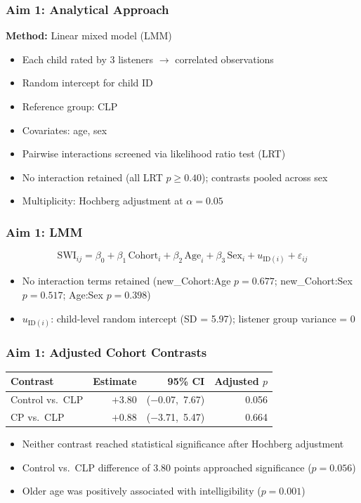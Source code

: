 \documentclass{beamer}
\begin{document}
\begin{frame}
\frametitle{Aim 1: Analytical Approach}
\textbf{Method:} Linear mixed model (LMM)
\begin{itemize}
  \item Each child rated by 3 listeners $\to$ correlated observations
  \item Random intercept for child ID 
  \item Reference group: CLP
  \item Covariates: age, sex
  \item Pairwise interactions screened via likelihood ratio test (LRT)
  \item No interaction retained (all LRT $p \geq 0.40$); contrasts pooled across sex
  \item Multiplicity: Hochberg adjustment at $\alpha = 0.05$
\end{itemize}
\end{frame}
\begin{frame}
\frametitle{Aim 1: LMM}
\[
\text{SWI}_{ij} = \beta_0 + \beta_1\,\text{Cohort}_i + \beta_2\,\text{Age}_i + \beta_3\,\text{Sex}_i + u_{\text{ID}(i)} + \varepsilon_{ij}
\]
\vspace{0.2em}
\begin{itemize}
  \item No interaction terms retained (new\_Cohort:Age $p=0.677$; new\_Cohort:Sex $p=0.517$; Age:Sex $p=0.398$)
  \item $u_{\text{ID}(i)}$: child-level random intercept (SD = 5.97); listener group variance = 0
\end{itemize}
\end{frame}
\begin{frame}
\frametitle{Aim 1: Adjusted Cohort Contrasts}
\vspace{0.2em}
\renewcommand{\arraystretch}{1.35}
\begin{center}
\small
\begin{tabular}{@{}lrrr@{}}
\toprule
\textbf{Contrast} & \textbf{Estimate} & \textbf{95\% CI} & \textbf{Adjusted \(p\)} \\
\midrule
Control vs.\ CLP & $+$3.80 & ($-$0.07,\ 7.67) & 0.056 \\
CP vs.\ CLP      & $+$0.88 & ($-$3.71,\ 5.47) & 0.664 \\
\bottomrule
\end{tabular}
\end{center}
\normalsize
\vspace{0.5em}
\begin{itemize}
  \item Neither contrast reached statistical significance after Hochberg adjustment
  \item Control vs.\ CLP difference of 3.80 points approached significance ($p = 0.056$)
  \item Older age was positively associated with intelligibility ($p = 0.001$)
\end{itemize}
\end{frame}
\end{document}
